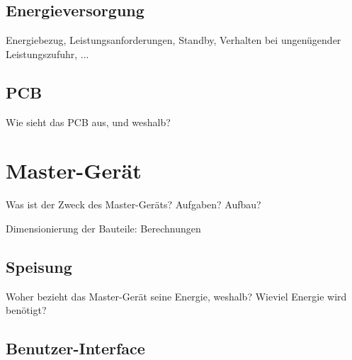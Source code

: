 \subsection{Energieversorgung}
\label{subsec:sensor:pcb}

Energiebezug,  Leistungsanforderungen, Standby,  Verhalten bei  ungen\"ugender
Leistungszufuhr, ...


\subsection{PCB}
\label{subsec:sensor:pcb}

Wie sieht das PCB aus, und weshalb?

\section{Master-Ger\"at}
\label{sec:hw:mastergerat}

Was ist der Zweck des Master-Ger\"ats? Aufgaben? Aufbau?

\anweisung Dimensionierung der Bauteile: Berechnungen


\subsection{Speisung}
\label{subsec:mastergerat:speisung}

Woher bezieht das Master-Ger\"at  seine Energie, weshalb? Wieviel Energie wird
ben\"otigt?


\subsection{Benutzer-Interface}
\label{subsec:mastergerat:interface}

